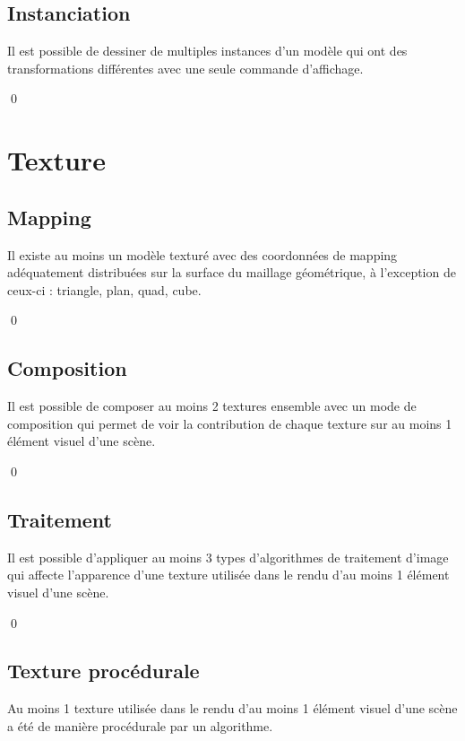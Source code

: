 \documentclass[12pt]{article}
\newcommand{\state}{\noindent}
\begin{document}
\subsection{Instanciation}

\state
Il est possible de dessiner de multiples instances d'un modèle qui ont des transformations différentes avec une seule commande d'affichage.

\qed

\pagebreak

\section{Texture}

\subsection{Mapping}

\state
Il existe au moins un modèle texturé avec des coordonnées de mapping adéquatement distribuées sur la surface du maillage géométrique, à l'exception de ceux-ci : triangle, plan, quad, cube.

\qed

\subsection{Composition}

\state
Il est possible de composer au moins 2 textures ensemble avec un mode de composition qui permet de voir la contribution de chaque texture sur au moins 1 élément visuel d'une scène.

\qed

\subsection{Traitement}

\state
Il est possible d'appliquer au moins 3 types d'algorithmes de traitement d'image qui affecte l'apparence d'une texture utilisée dans le rendu d'au moins 1 élément visuel d'une scène.

\qed

\subsection{Texture procédurale}

\state
Au moins 1 texture utilisée dans le rendu d'au moins 1 élément visuel d'une scène a été de manière procédurale par un algorithme.
\end{document}
